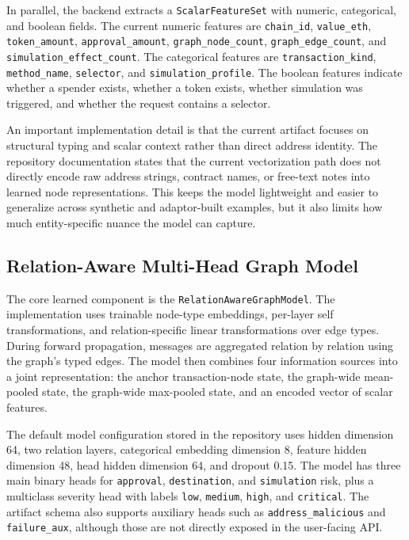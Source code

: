 \documentclass[11pt]{article}
\begin{document}
In parallel, the backend extracts a \texttt{ScalarFeatureSet} with numeric, categorical, and boolean fields. The current numeric features are \texttt{chain\_id}, \texttt{value\_eth}, \texttt{token\_amount}, \texttt{approval\_amount}, \texttt{graph\_node\_count}, \texttt{graph\_edge\_count}, and \texttt{simulation\_effect\_count}. The categorical features are \texttt{transaction\_kind}, \texttt{method\_name}, \texttt{selector}, and \texttt{simulation\_profile}. The boolean features indicate whether a spender exists, whether a token exists, whether simulation was triggered, and whether the request contains a selector.

An important implementation detail is that the current artifact focuses on structural typing and scalar context rather than direct address identity. The repository documentation states that the current vectorization path does not directly encode raw address strings, contract names, or free-text notes into learned node representations. This keeps the model lightweight and easier to generalize across synthetic and adaptor-built examples, but it also limits how much entity-specific nuance the model can capture.

\subsection{Relation-Aware Multi-Head Graph Model}

The core learned component is the \texttt{RelationAwareGraphModel}. The implementation uses trainable node-type embeddings, per-layer self transformations, and relation-specific linear transformations over edge types. During forward propagation, messages are aggregated relation by relation using the graph's typed edges. The model then combines four information sources into a joint representation: the anchor transaction-node state, the graph-wide mean-pooled state, the graph-wide max-pooled state, and an encoded vector of scalar features.

The default model configuration stored in the repository uses hidden dimension 64, two relation layers, categorical embedding dimension 8, feature hidden dimension 48, head hidden dimension 64, and dropout 0.15. The model has three main binary heads for \texttt{approval}, \texttt{destination}, and \texttt{simulation} risk, plus a multiclass severity head with labels \texttt{low}, \texttt{medium}, \texttt{high}, and \texttt{critical}. The artifact schema also supports auxiliary heads such as \texttt{address\_malicious} and \texttt{failure\_aux}, although those are not directly exposed in the user-facing API.
\end{document}
